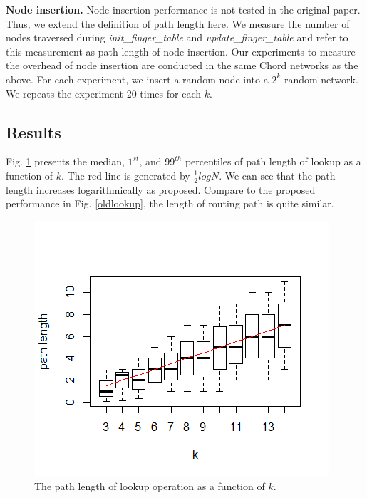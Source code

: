 \documentclass{article}
\begin{document}
\textbf{Node insertion.} Node insertion performance is not tested in the original paper. Thus, we extend the definition of path length here. We measure the number of nodes traversed during \textit{init\_finger\_table} and \textit{update\_finger\_table} and refer to this measurement as path length of node insertion. Our experiments to measure the overhead of node insertion are conducted in the same Chord networks as the above. For each experiment, we insert a random node into a $2^k$ random network. We repeats the experiment $20$ times for each $k$.

\subsection*{Results}
Fig. \ref{lookup} presents the median, $1^{st}$, and $99^{th}$ percentiles of path length of lookup as a function of $k$. The red line is generated by $\frac{1}{2}logN$. We can see that the path length increases logarithmically as proposed. Compare to the proposed performance in Fig. \ref{oldlookup}, the length of routing path is quite similar. 
\begin{figure}[H]
\centering
\includegraphics[scale=1.2]{lookup.png}
\caption{The path length of lookup operation as a function of $k$.
\label{lookup}}
\end{figure}
\end{document}
